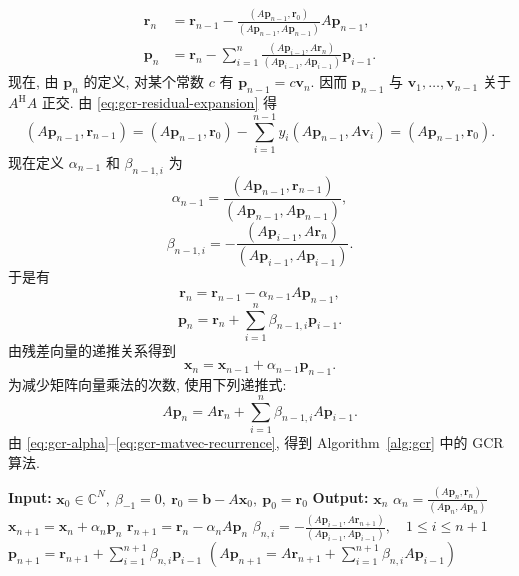 \[\begin{aligned}\bm r_n&=\bm r_{n-1}-\frac{(A\bm p_{n-1},\bm r_0)}{(A\bm p_{n-1},A\bm p_{n-1})}A\bm p_{n-1},\\\bm p_n&=\bm r_n-\sum_{i=1}^n\frac{(A\bm p_{i-1},A\bm r_n)}{(A\bm p_{i-1},A\bm p_{i-1})}\bm p_{i-1}.\end{aligned}\]
{现在, 由 $\bm p_n$ 的定义, 对某个常数 $c$ 有 $\bm p_{n-1}=c\bm v_n$. 因而 $\bm p_{n-1}$ 与 $\bm v_1,\ldots,\bm v_{n-1}$ 关于 $A^{\mathrm H}A$ 正交. 由 \eqref{eq:gcr-residual-expansion} 得}
\[(A\bm p_{n-1},\bm r_{n-1})=(A\bm p_{n-1},\bm r_0)-\sum_{i=1}^{n-1}y_i(A\bm p_{n-1},A\bm v_i)=(A\bm p_{n-1},\bm r_0).\]
{现在定义 $\alpha_{n-1}$ 和 $\beta_{n-1,i}$ 为}
\begin{equation}\label{eq:gcr-alpha}\alpha_{n-1}=\frac{(A\bm p_{n-1},\bm r_{n-1})}{(A\bm p_{n-1},A\bm p_{n-1})},\end{equation}
\begin{equation}\label{eq:gcr-beta}\beta_{n-1,i}=-\frac{(A\bm p_{i-1},A\bm r_n)}{(A\bm p_{i-1},A\bm p_{i-1})}.\end{equation}
{于是有}
\begin{equation}\label{eq:gcr-residual-recurrence}\bm r_n=\bm r_{n-1}-\alpha_{n-1}A\bm p_{n-1},\end{equation}
\begin{equation}\label{eq:gcr-direction-recurrence}\bm p_n=\bm r_n+\sum_{i=1}^n\beta_{n-1,i}\bm p_{i-1}.\end{equation}
{由残差向量的递推关系得到}
\begin{equation}\label{eq:gcr-solution-recurrence}\bm x_n=\bm x_{n-1}+\alpha_{n-1}\bm p_{n-1}.\end{equation}
{为减少矩阵向量乘法的次数, 使用下列递推式:}
\begin{equation}\label{eq:gcr-matvec-recurrence}A\bm p_n=A\bm r_n+\sum_{i=1}^n\beta_{n-1,i}A\bm p_{i-1}.\end{equation}
{由 \eqref{eq:gcr-alpha}--\eqref{eq:gcr-matvec-recurrence}, 得到 Algorithm\ \ref{alg:gcr} 中的 GCR 算法.}
\begin{algorithm}[H]\caption{{GCR 方法}}\label{alg:gcr}\begin{algorithmic}[1]
\Statex\textbf{Input:} $\bm x_0\in\mathbb C^N,\ \beta_{-1}=0,\ \bm r_0=\bm b-A\bm x_0,\ \bm p_0=\bm r_0$
\Statex\textbf{Output:} $\bm x_n$
\State $\alpha_n=\frac{(A\bm p_n,\bm r_n)}{(A\bm p_n,A\bm p_n)}$
\State $\bm x_{n+1}=\bm x_n+\alpha_n\bm p_n$
\State $\bm r_{n+1}=\bm r_n-\alpha_nA\bm p_n$
\State $\beta_{n,i}=-\frac{(A\bm p_{i-1},A\bm r_{n+1})}{(A\bm p_{i-1},A\bm p_{i-1})},\quad1\le i\le n+1$
\State $\bm p_{n+1}=\bm r_{n+1}+\sum_{i=1}^{n+1}\beta_{n,i}\bm p_{i-1}$
\State $(A\bm p_{n+1}=A\bm r_{n+1}+\sum_{i=1}^{n+1}\beta_{n,i}A\bm p_{i-1})$
\EndFor\end{algorithmic}\end{algorithm}
